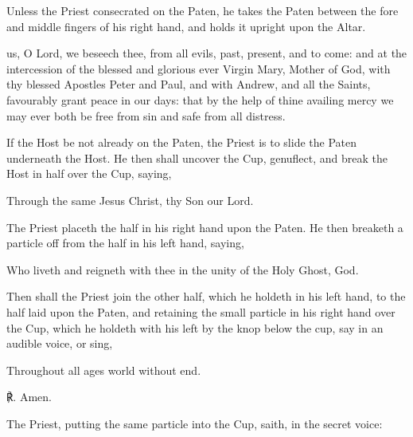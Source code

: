 \begin{rubric}
    Unless the Priest consecrated on the Paten, he takes the Paten between the fore and middle fingers of his right hand, and holds it upright upon the Altar.
\end{rubric}
 us, O Lord, we beseech thee, from all evils, past, present, and to come: and at the intercession of the blessed and glorious ever Virgin Mary, Mother of God, with thy blessed Apostles Peter and Paul, and with Andrew, and all the Saints, favourably grant peace in our days: that by the help of thine availing mercy we may ever both be free from sin and safe from all distress.
\begin{rubric}
    If the Host be not already on the Paten, the Priest is to slide the Paten underneath the Host. He then shall uncover the Cup, genuflect, and break the Host in half over the Cup, saying,
\end{rubric}\par\noindent
Through the same Jesus Christ, thy Son our Lord.
\begin{rubric}
    The Priest placeth the half in his right hand upon the Paten. He then breaketh a particle off from the half in his left hand, saying,
\end{rubric}\par\noindent
Who liveth and reigneth with thee in the unity of the Holy Ghost, God.
\begin{rubric}
    Then shall the Priest join the other half, which he holdeth in his left hand, to the half laid upon the Paten, and retaining the small particle in his right hand over the Cup, which he holdeth with his left by the knop below the cup, say in an audible voice, or sing,
\end{rubric}\par\noindent
Throughout all ages world without end.\par
℟. Amen.\setcounter{margcount}{1}\setcounter{latinrubric}{1}
\begin{rubric}
    The Priest, putting the same particle into the Cup, saith, in the secret voice:
\end{rubric}
